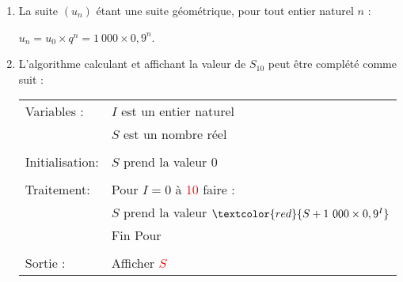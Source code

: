 \begin{corrige}
     \begin{enumerate}
          \item
          La suite $(u_n)$ étant une suite géométrique, pour tout entier naturel $n$ :
          \par
          $u_n=u_0 \times q^n=1~000 \times 0,9^n$.
          \item
          L'algorithme calculant et affichant la valeur de $S_{10}$ peut être complété comme suit :
          \par
          \begin{center}
               \begin{extern}%
                    \begin{tabular}{|l l|}\hline
                         Variables :	&$I$ est un entier naturel\\
                         &$S$ est un nombre réel\\
                         & \\
                         Initialisation: &$S$ prend la valeur 0\\
                         & \\
                         Traitement: &Pour $I=0$ à \textcolor{red}{10} faire :\\
                         &\qquad$S$ prend la valeur $\textcolor{red}{S+1~000 \times 0,9^I}$\\
                         &Fin Pour\\
                         & \\
                         Sortie :	&Afficher \textcolor{red}{$S$} \\
                         \hline
                    \end{tabular}
               \end{extern}
          \end{center}
          \par
\end{enumerate}
\end{corrige}
